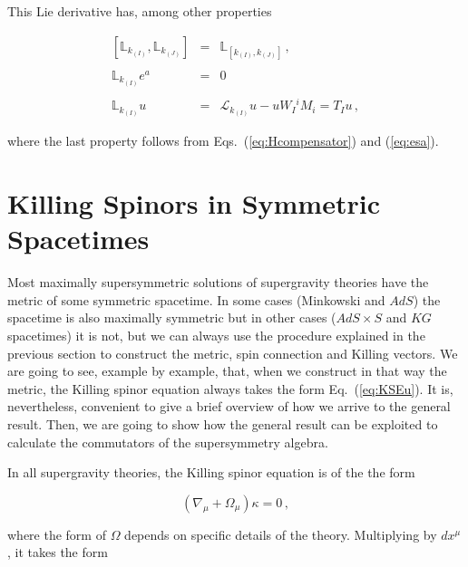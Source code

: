 \documentclass[12pt,a4paper]{article}
\begin{document}
This Lie derivative has, among other properties 

\begin{eqnarray}
\label{eq:Liebracketproperty}
[\mathbb{L}_{k_{(I)}},\mathbb{L}_{k_{(J)}}] & = & 
\mathbb{L}_{[k_{(I)},k_{(J)}]}\, ,  \\
& & \nonumber \\
\mathbb{L}_{k_{(I)}} e^{a} & = & 0\, \\
& & \nonumber \\
\label{eq:lastproperty}
\mathbb{L}_{k_{(I)}} u & = &  
\mathcal{L}_{k_{(I)}}u -u W_{I}{}^{i}M_{i} = T_{I} u\, ,
\end{eqnarray}

\noindent 
where the last property follows from Eqs.~(\ref{eq:Hcompensator}) and
(\ref{eq:esa}).


\section{Killing Spinors in Symmetric Spacetimes}
\label{sec-KSSS}

Most maximally supersymmetric solutions of supergravity theories have
the metric of some symmetric spacetime. In some cases (Minkowski and
$AdS$) the spacetime is also maximally symmetric but in other cases
($AdS\times S$ and $KG$ spacetimes) it is not, but we can always use
the procedure explained in the previous section to construct the
metric, spin connection and Killing vectors. We are going to see,
example by example, that, when we construct in that way the metric,
the Killing spinor equation always takes the form Eq.~(\ref{eq:KSEu}).
It is, nevertheless, convenient to give a brief overview of how we
arrive to the general result. Then, we are going to show how the
general result can be exploited to calculate the commutators of the
supersymmetry algebra.

In all supergravity theories, the Killing spinor equation is of the
the form

\begin{equation}
(\nabla_{\mu} + \Omega_{\mu})\kappa=0\, , 
\end{equation}

\noindent
where the form of $\Omega$ depends on specific details of the theory.
Multiplying by $dx^{\mu}$, it takes the form
\end{document}
